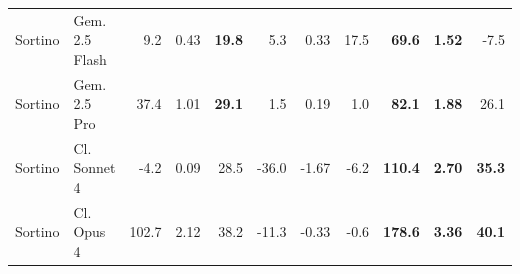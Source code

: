 \begin{table}[H]
{\begin{tabular}{ll rrr rrr rrr}
Sortino & Gem. 2.5 Flash & 9.2 & 0.43 & \textbf{19.8} & 5.3 & 0.33 & 17.5 & \textbf{69.6} & \textbf{1.52} & -7.5 \\
Sortino & Gem. 2.5 Pro & 37.4 & 1.01 & \textbf{29.1} & 1.5 & 0.19 & 1.0 & \textbf{82.1} & \textbf{1.88} & 26.1 \\
Sortino & Cl. Sonnet 4 & -4.2 & 0.09 & 28.5 & -36.0 & -1.67 & -6.2 & \textbf{110.4} & \textbf{2.70} & \textbf{35.3} \\
Sortino & Cl. Opus 4 & 102.7 & 2.12 & 38.2 & -11.3 & -0.33 & -0.6 & \textbf{178.6} & \textbf{3.36} & \textbf{40.1} \\
\bottomrule
\end{tabular}
}
\end{table}
